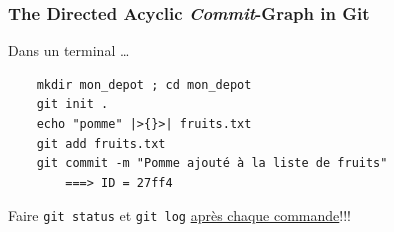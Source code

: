 \documentclass[table,tikz,12pt,svgnames]{beamer}
\begin{document}
\begin{frame}[fragile]
\frametitle{The Directed Acyclic \textit{Commit}-Graph in Git}
 	\begin{figure}
	\end{figure}

	\begin{block}{Dans un terminal \ldots}
	\vspace{-0.2cm}		
	\begin{verbatim}
	mkdir mon_depot ; cd mon_depot
	git init .
	echo "pomme" |>{}>| fruits.txt
	git add fruits.txt
	git commit -m "Pomme ajouté à la liste de fruits"
		===> ID = 27ff4
	\end{verbatim}
	\end{block}
	Faire \texttt{git status} et \texttt{git log} \underline{après chaque commande}!!!
\end{frame}
\end{document}
